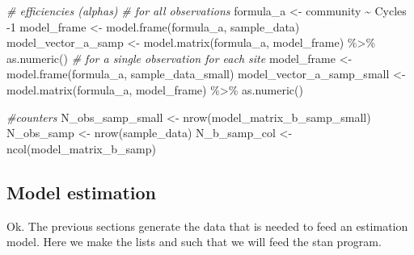 \documentclass[
]{article}
\newenvironment{Shaded}{\begin{snugshade}}{\end{snugshade}}
\newcommand{\CommentTok}[1]{\textcolor[rgb]{0.56,0.35,0.01}{\textit{#1}}}
\newcommand{\DecValTok}[1]{\textcolor[rgb]{0.00,0.00,0.81}{#1}}
\newcommand{\FunctionTok}[1]{\textcolor[rgb]{0.00,0.00,0.00}{#1}}
\newcommand{\NormalTok}[1]{#1}
\newcommand{\OtherTok}[1]{\textcolor[rgb]{0.56,0.35,0.01}{#1}}
\newcommand{\SpecialCharTok}[1]{\textcolor[rgb]{0.00,0.00,0.00}{#1}}
\begin{document}
\begin{Shaded}
\begin{Highlighting}[]
  \CommentTok{\# efficiencies (alphas)}
  \CommentTok{\# for all observations}
\NormalTok{  formula\_a }\OtherTok{\textless{}{-}}\NormalTok{ community }\SpecialCharTok{\textasciitilde{}}\NormalTok{ Cycles }\SpecialCharTok{{-}}\DecValTok{1}
\NormalTok{  model\_frame }\OtherTok{\textless{}{-}} \FunctionTok{model.frame}\NormalTok{(formula\_a, sample\_data)}
\NormalTok{  model\_vector\_a\_samp }\OtherTok{\textless{}{-}} \FunctionTok{model.matrix}\NormalTok{(formula\_a, model\_frame) }\SpecialCharTok{\%\textgreater{}\%} \FunctionTok{as.numeric}\NormalTok{()}
  \CommentTok{\# for a single observation for each site}
\NormalTok{  model\_frame }\OtherTok{\textless{}{-}} \FunctionTok{model.frame}\NormalTok{(formula\_a, sample\_data\_small)}
\NormalTok{  model\_vector\_a\_samp\_small }\OtherTok{\textless{}{-}} \FunctionTok{model.matrix}\NormalTok{(formula\_a, model\_frame) }\SpecialCharTok{\%\textgreater{}\%} \FunctionTok{as.numeric}\NormalTok{()}
  
  \CommentTok{\#counters }
\NormalTok{  N\_obs\_samp\_small }\OtherTok{\textless{}{-}} \FunctionTok{nrow}\NormalTok{(model\_matrix\_b\_samp\_small)}
\NormalTok{  N\_obs\_samp }\OtherTok{\textless{}{-}} \FunctionTok{nrow}\NormalTok{(sample\_data)}
\NormalTok{  N\_b\_samp\_col }\OtherTok{\textless{}{-}} \FunctionTok{ncol}\NormalTok{(model\_matrix\_b\_samp)  }
\end{Highlighting}
\end{Shaded}

\hypertarget{model-estimation}{%
\subsection{Model estimation}\label{model-estimation}}

Ok. The previous sections generate the data that is needed to feed an
estimation model. Here we make the lists and such that we will feed the
stan program.
\end{document}
